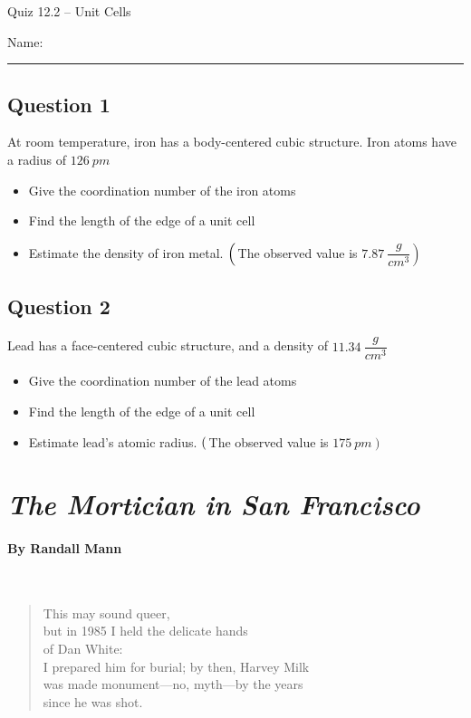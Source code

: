 \documentclass[11pt, letterpaper]{memoir}
\begin{document}
	\begin{center}
		{\large	Quiz 12.2 -- Unit Cells}
	\end{center}
	{\large Name: \rule[-1mm]{4in}{.1pt} 
	
	\subsection*{Question 1}
	At room temperature, iron has a body-centered cubic structure. Iron atoms have a radius of $126~pm$
	\begin{itemize}
		\item Give the coordination number of the iron atoms
		\item Find the length of the edge of a unit cell
		\item Estimate the density of iron metal. $\left(\vphantom{\dfrac{g}{cm^3}}\right.$The observed value is $\left.7.87~\dfrac{g}{cm^3}\right)$
	\end{itemize}
	
	\vspace{13em}
	\subsection*{Question 2}
	Lead has a face-centered cubic structure, and a density of $11.34~\dfrac{g}{cm^3}$
	\begin{itemize}
		\item Give the coordination number of the lead atoms
		\item Find the length of the edge of a unit cell
		\item Estimate lead's atomic radius. $\left(\vphantom{pm}\right.$The observed value is $\left.175~pm\right)$
	\end{itemize}

	\newpage
	\pagestyle{empty}
	\addtocounter{page}{-1}
  \section*{\emph{The Mortician in San Francisco}}
  \paragraph{By Randall Mann}~
  \begin{verse}
    This may sound queer,\\
    but in 1985 I held the delicate hands\\
    of Dan White:\\
    I prepared him for burial; by then, Harvey Milk\\
    was made monument—no, myth—by the years\\
    since he was shot.
    

\end{verse}}
\end{document}
